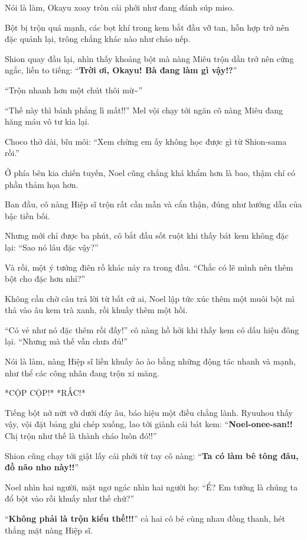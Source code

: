\documentclass[../main.tex]{subfiles}
\begin{document}
Nói là làm, Okayu xoay tròn cái phới như đang đánh súp miso.

Bột bị trộn quá mạnh, các bọt khí trong kem bắt đầu vỡ tan, hỗn hợp trở nên đặc quánh lại, trông chẳng khác nào như cháo nếp.

Shion quay đầu lại, nhìn thấy khoảng bột mà nàng Miêu trộn dần trở nên cứng ngắc, liền to tiếng: ``\textbf{Trời ơi, Okayu! Bà đang làm gì vậy!?}''

``Trộn nhanh hơn một chút thôi mừ\~{}''

``Thế này thì bánh phẳng lì mất!!'' Mel vội chạy tới ngăn cô nàng Miêu đang hăng máu vô tư kia lại.

Choco thở dài, bĩu môi: ``Xem chừng em ấy không học được gì từ Shion-sama rồi.''

Ở phía bên kia chiến tuyến, Noel cũng chẳng khá khẩm hơn là bao, thậm chí có phần thảm họa hơn.

Ban đầu, cô nàng Hiệp sĩ trộn rất cần mẫn và cẩn thận, đúng như hướng dẫn của bậc tiền bối.

Nhưng mới chỉ được ba phút, cô bắt đầu sốt ruột khi thấy bát kem không đặc lại: ``Sao nó lâu đặc vậy?''

Và rồi, một ý tưởng điên rồ khác nảy ra trong đầu. ``Chắc có lẽ mình nên thêm bột cho đặc hơn nhỉ?''

Không cần chờ câu trả lời từ bất cứ ai, Noel lập tức xúc thêm một muôi bột mì thả vào âu kem trà xanh, rồi khuấy thêm một hồi.

``Có vẻ như nó đặc thêm rồi đấy!'' cô nàng hồ hởi khi thấy kem có dấu hiệu đông lại. ``Nhưng mà thế vẫn chưa đủ!''

Nói là làm, nàng Hiệp sĩ liền khuấy ào ào bằng những động tác nhanh và mạnh, như thể các công nhân đang trộn xi măng.

*CỘP CỘP!* *RẮC!*

Tiếng bột nở nứt vỡ dưới đáy âu, báo hiệu một điều chẳng lành. Ryuuhou thấy vậy, vội đặt bảng ghi chép xuống, lao tới giành cái bát kem: ``\textbf{Noel-onee-san!!} Chị trộn như thế là thành cháo luôn đó!!''

Shion cũng chạy tới giật lấy cái phới từ tay cô nàng: ``\textbf{Ta có làm bê tông đâu, đồ não nho này!!}''

Noel nhìn hai người, mặt ngơ ngác nhìn hai người họ: ``Ể? Em tưởng là chúng ta đổ bột vào rồi khuấy như thế chứ?''

``\textbf{Không phải là trộn kiểu thế!!!}'' cả hai cô bé cùng nhau đồng thanh, hét thẳng mặt nàng Hiệp sĩ.
\end{document}
